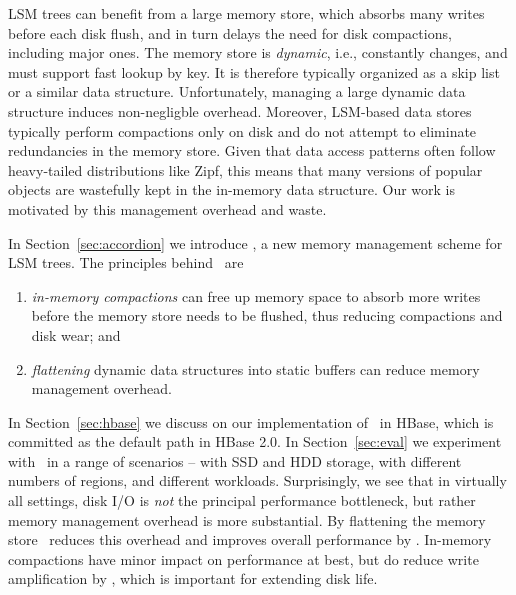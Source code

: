 LSM trees can benefit from a large memory store, which absorbs many writes before each disk flush, 
and in turn delays the need for disk compactions,  including major ones. 
The memory store is \emph{dynamic}, i.e., constantly changes, and must support fast lookup by key. 
It is therefore typically organized as a skip list
 or a similar data structure.  Unfortunately, managing a large dynamic data structure induces 
non-negligble  overhead. 
Moreover, 
LSM-based data stores typically perform compactions only on disk and do not attempt to eliminate redundancies in the memory store.
Given that data access patterns often follow heavy-tailed distributions like Zipf,  this means that many versions of popular objects are 
wastefully kept in the in-memory data structure. 
Our work is motivated by this management overhead and waste. 

In Section~\ref{sec:accordion}
we introduce \sys, a new memory management scheme for LSM trees.
The principles behind \sys\ are 
\begin{enumerate}
\item \emph{in-memory compactions} can free up memory space to absorb more writes before the
memory store needs to be flushed, thus reducing compactions and disk wear; and
\item \emph{flattening} dynamic data structures into static buffers can reduce memory management overhead.
\end{enumerate}

In Section~\ref{sec:hbase} we  discuss on our implementation of  \sys\ in HBase, which is committed  as the default path in HBase 2.0. 
In Section~\ref{sec:eval} we experiment with \sys\ in a range of  scenarios -- with SSD and HDD storage, with different numbers
of regions, and different workloads. Surprisingly, we see that in virtually all settings, disk I/O is \emph{not} the principal performance bottleneck,
but rather memory management overhead is more substantial. By flattening the memory store \sys\ reduces this overhead and improves overall performance by . In-memory compactions have minor impact on performance at best, but do reduce 
write amplification by , which is important for extending disk life.





